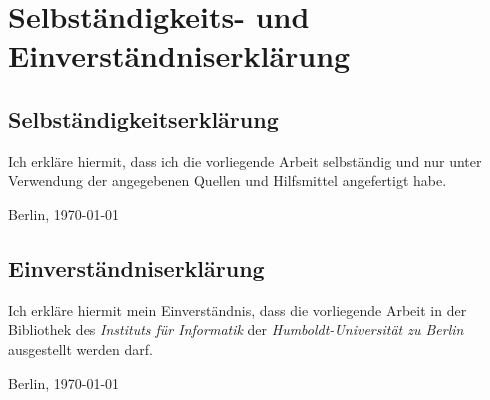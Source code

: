 
\chapter*{Selbständigkeits- und Einverständniserklärung}

\section*{Selbständigkeitserklärung}

Ich erkläre hiermit, dass ich die vorliegende Arbeit selbständig und
nur unter Verwendung der angegebenen Quellen und Hilfsmittel
angefertigt habe.

\vspace*{1.8cm}

Berlin, \today

\section*{Einverständniserklärung}

Ich erkläre hiermit mein Einverständnis, dass die vorliegende Arbeit
in der Bibliothek des \textit{Instituts für Informatik} der
\textit{Humboldt-Universität zu Berlin} ausgestellt werden darf.

\vspace*{1.8cm}

Berlin, \today


